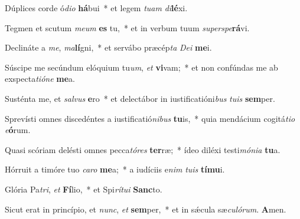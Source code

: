 \item Dúplices corde ó\textit{di}\textit{o} \textbf{há}bui~* et legem \textit{tu}\textit{am} \textit{di}\textbf{lé}xi.

\item Tegmen et scutum \textit{me}\textit{um} \textbf{es} tu,~* et in verbum tuum \textit{su}\textit{per}\textit{spe}\textbf{rá}vi.

\item Declináte a \textit{me}, \textit{ma}\textbf{lí}gni,~* et servábo præcép\textit{ta} \textit{De}\textit{i} \textbf{me}i.

\item Súscipe me secúndum elóquium tu\textit{um}, \textit{et} \textbf{vi}vam;~* et non confúndas me ab exspecta\textit{ti}\textit{ó}\textit{ne} \textbf{me}a.

\item Susténta me, et \textit{sal}\textit{vus} \textbf{e}ro~* et delectábor in iustificatióni\textit{bus} \textit{tu}\textit{is} \textbf{sem}per.

\item Sprevísti omnes discedéntes a iustificatió\textit{ni}\textit{bus} \textbf{tu}is,~* quia mendácium cogitá\textit{ti}\textit{o} \textit{e}\textbf{ó}rum.

\item Quasi scóriam delésti omnes pecca\textit{tó}\textit{res} \textbf{ter}ræ;~* ídeo diléxi testi\textit{mó}\textit{ni}\textit{a} \textbf{tu}a.

\item Hórruit a timóre tuo \textit{ca}\textit{ro} \textbf{me}a;~* a iudíciis e\textit{nim} \textit{tu}\textit{is} \textbf{tí}\textbf{mu}i.

\item Glória Pa\textit{tri}, \textit{et} \textbf{Fí}lio,~* et Spi\textit{rí}\textit{tu}\textit{i} \textbf{Sanc}to.

\item Sicut erat in princípio, et \textit{nunc}, \textit{et} \textbf{sem}per,~* et in sǽcula sæ\textit{cu}\textit{ló}\textit{rum}. \textbf{A}men.

